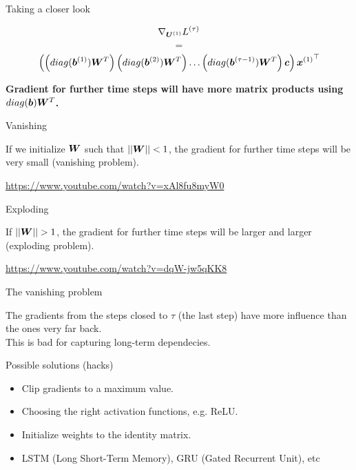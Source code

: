 \documentclass[10pt]{beamer}
\begin{document}
\begin{frame}{Taking a closer look}


\[
\nabla_{\bm{U}^{(1)}} {L^{(\tau)}}
\]
\[
=
\]
\[
\left({\left(diag(\bm{b}^{(1)}) \bm{W}^{T} \right) \left(diag(\bm{b}^{(2)}) \bm{W}^{T}\right) \dots \left(diag(\bm{b}^{(\tau-1)}) \bm{W}^{T}\right)\bm{c}}\right){\bm{x}^{(1)}}^{\top}
\]

\vspace{0.5cm}

\textbf{Gradient for further time steps will have more matrix products using $diag(\bm{b}) \bm{W}^{T}$.
}\end{frame}

\begin{frame}{Vanishing}

If we initialize $\bm{W}$ such that $||\bm{W}|| < 1$, the gradient for further time steps will be very small (\alert{vanishing problem}).

\vspace{0.8cm}
 \url{https://www.youtube.com/watch?v=xAl8fu8myW0}


\end{frame}



\begin{frame}{Exploding}

If $||\bm{W}|| > 1$, the gradient for further time steps will be larger and larger (\alert{exploding problem}).

\vspace{0.8cm}
 \url{https://www.youtube.com/watch?v=dqW-jw5qKK8}


\end{frame}


\begin{frame}{The vanishing problem}

The gradients from the steps closed to $\tau$ (the last step) have more influence than the ones very far back.\\

This is bad for capturing \alert{long-term dependecies}.
\end{frame}

\begin{frame}{Possible solutions (hacks)}
\begin{itemize}
\item Clip gradients to a maximum value.
\vspace{0.4cm}
\item Choosing the right activation functions, e.g. ReLU.
\vspace{0.4cm}
\item Initialize weights to the identity matrix.
\vspace{0.4cm}
\item LSTM (Long Short-Term Memory), GRU (Gated Recurrent Unit), etc
\end{itemize}
\end{frame}
\end{document}
